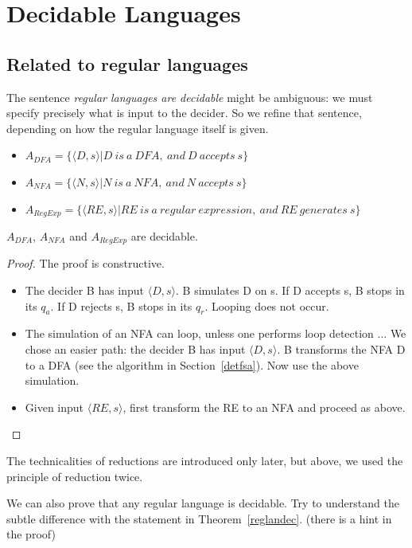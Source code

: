 \section{Decidable Languages}

\subsection{Related to regular languages}

The sentence {\em regular languages are decidable} might be ambiguous:
we must specify precisely what is input to the decider. So we refine
that sentence, depending on how the regular language itself is given.


\begin{itemize}
\item
$A_{DFA} = \{\langle D,s \rangle|D~is~a~DFA,~and~D~accepts~s\}$
\item
$A_{NFA} = \{\langle N,s \rangle|N~is~a~NFA,~and~N~accepts~s\}$
\item
$A_{RegExp} = \{\langle RE,s
  \rangle|RE~is~a~regular~expression,~and~RE~generates~s\}$
\end{itemize}

\begin{theorem} \label{reglandec}
$A_{DFA}$, $A_{NFA}$ and $A_{RegExp}$ are decidable.
\end{theorem}
\begin{proof}
The proof is constructive.
\begin{itemize}
\item
The decider B has input $\langle D,s \rangle$. B simulates D on s. If
D accepts s, B stops in its $q_a$. If D rejects s, B stops in its
$q_r$. Looping does not occur.

\item
The simulation of an NFA can loop, unless one performs loop detection
... We chose an easier path: the decider B has input $\langle D,s
\rangle$. B transforms the NFA D to a DFA (see the algorithm in
Section~\ref{detfsa}). Now use the above simulation.

\item
Given input $\langle RE,s \rangle$, first transform the RE to an NFA
and proceed as above.
\end{itemize}
\end{proof}

The technicalities of reductions are introduced only later, but
above, we used the principle of reduction twice.

We can also prove that any regular language is decidable. Try to
understand the subtle difference with the statement in
Theorem~\ref{reglandec}. (there is a hint in the proof)



